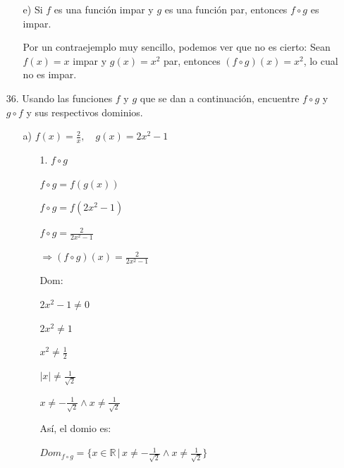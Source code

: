 \documentclass{article}
\begin{document}
\begin{enumerate}
\begin{enumerate}
        \item[e)] Si \( f \) es una función impar y \( g \) es una función par, entonces \( f \circ g \) es impar.
        
        Por un contraejemplo muy sencillo, podemos ver que no es cierto: Sean \( f(x) = x \) impar y \( g(x) = x^2 \) par, entonces \( (f \circ g)(x) = x^2 \), lo cual no es impar.
    \end{enumerate}
    \vspace{\baselineskip}

\item[36.] Usando las funciones \(f\) y \(g\) que se dan a continuación, encuentre \(f \circ g\) y \(g \circ f\) y sus respectivos dominios.
    \begin{enumerate}
        \item[a)] \(f(x) = \frac{2}{x}, \quad g(x) = 2x^2 - 1\)
            \begin{enumerate}
                \item[1.] \(f \circ g\)
                
                \( f \circ g = f(g(x)) \)
                
                \( f \circ g = f(2x^2 - 1) \)
                
                \( f \circ g = \frac{2}{2x^2 - 1} \)
                \vspace{\baselineskip}
                
                \(\Rightarrow (f \circ g)(x) = \frac{2}{2x^2 - 1} \)
                \vspace{\baselineskip}
                
                Dom:
                
                \(2x^2 - 1 \neq 0 \)
                
                \( 2x^2 \neq 1 \)
                
                \( x^2 \neq \frac{1}{2} \)
                
                \( |x| \neq \frac{1}{\sqrt{2}} \)
                
                \( x \neq -\frac{1}{\sqrt{2}} \land x \neq \frac{1}{\sqrt{2}} \)
                \vspace{\baselineskip}

                Así, el domio es:
                
                \(Dom_{f \circ g} = \{x \in \mathbb{R} \, | \, x \neq -\frac{1}{\sqrt{2}} \land x \neq \frac{1}{\sqrt{2}}\} \)
                

\end{enumerate}
\end{enumerate}
\end{enumerate}
\end{document}
